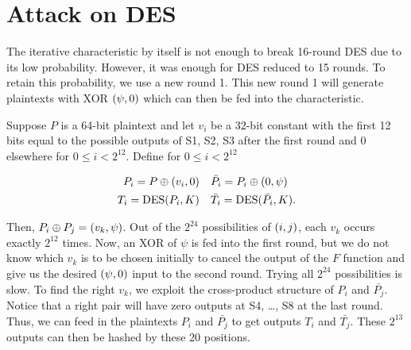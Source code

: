\documentclass[twoside]{article}
\begin{document}



\section{Attack on DES}

The iterative characteristic by itself is not enough to break 16-round DES due
to its low probability. However, it was enough for DES reduced to 15 rounds. To
retain this probability, we use a new round 1. This new round 1 will generate
plaintexts with XOR \((\psi,0)\) which can then be fed into the
characteristic.

Suppose \(P\) is a 64-bit plaintext and let \(v_i\) be a 32-bit constant with
the first 12 bits equal to the possible outputs of S1, S2, S3 after the first
round and 0 elsewhere for \(0 \le i < 2^{12}\). Define for \(0 \le i < 2^{12}\)

\begin{align}
    P_i = P \oplus (v_i, 0) \quad & \bar{P_i} = P_i \oplus (0, \psi) \label{eq:pi-def} \\
    T_i = \textrm{DES}(P_i, K) \quad & \bar{T_i} = \textrm{DES}(\bar{P_i}, K). \label{eq:ti-def}
\end{align}

Then, \(P_i \oplus P_j = (v_k, \psi)\). Out of the \(2^{24}\) possibilities
of \((i, j)\), each \(v_k\) occurs exactly \(2^{12}\) times. Now, an XOR of
\(\psi\) is fed into the first round, but we do not know which \(v_k\) is to be
chosen initially to cancel the output of the \(F\) function and give us the
desired \((\psi, 0)\) input to the second round. Trying all \(2^{24}\)
possibilities is slow. To find the right \(v_k\), we exploit the cross-product
structure of \(P_i\) and \(\bar{P_j}\). Notice that a right pair will have zero
outputs at S4, \dots, S8 at the last round. Thus, we can feed in the plaintexts
\(P_i\) and \(\bar{P_j}\) to get outputs \(T_i\) and \(\bar{T_j}\). These
\(2^{13}\) outputs can then be hashed by these 20 positions.
\end{document}
